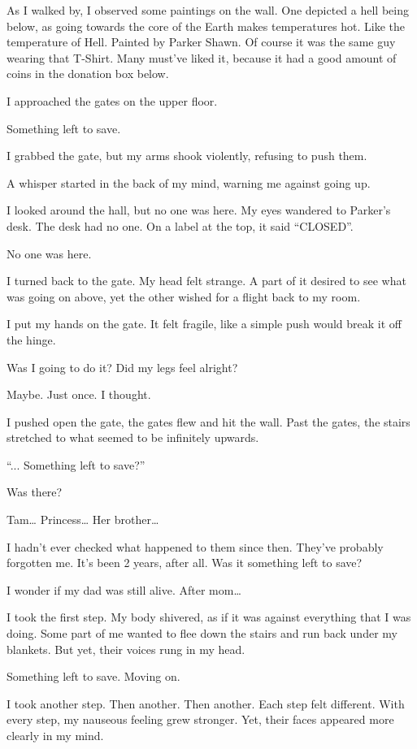 As I walked by, I observed some paintings on the wall. One depicted a hell being below, as going towards the core of the Earth makes temperatures hot. Like the temperature of Hell. Painted by Parker Shawn. Of course it was the same guy wearing that T-Shirt. Many must’ve liked it, because it had a good amount of coins in the donation box below.

I approached the gates on the upper floor.

Something left to save.

I grabbed the gate, but my arms shook violently, refusing to push them.

A whisper started in the back of my mind, warning me against going up.

I looked around the hall, but no one was here. My eyes wandered to Parker's desk. The desk had no one. On a label at the top, it said “CLOSED”.

No one was here.

I turned back to the gate. My head felt strange. A part of it desired to see what was going on above, yet the other wished for a flight back to my room.

I put my hands on the gate. It felt fragile, like a simple push would break it off the hinge.

Was I going to do it? Did my legs feel alright?

Maybe. Just once. I thought. 

I pushed open the gate, the gates flew and hit the wall. Past the gates, the stairs stretched to what seemed to be infinitely upwards.

“... Something left to save?” 

Was there?

Tam… Princess… Her brother…

I hadn’t ever checked what happened to them since then. They’ve probably forgotten me. It’s been 2 years, after all. Was it something left to save? 

I wonder if my dad was still alive. After mom…

I took the first step. My body shivered, as if it was against everything that I was doing. Some part of me wanted to flee down the stairs and run back under my blankets. But yet, their voices rung in my head.

Something left to save. Moving on.

I took another step. Then another. Then another. Each step felt different. With every step, my nauseous feeling grew stronger. Yet, their faces appeared more clearly in my mind.

